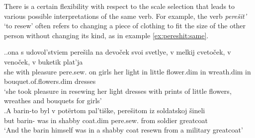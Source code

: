 %
%
%

There is a certain flexibility with respect to the scale selection that leads to various possible interpretations of the same  verb. For example, the verb \textit{pere\v{s}it'} `to resew' often refers to changing a piece of clothing to fit the size of the other person without changing its kind, as in example \ref{ex:pereshit:same}.\largerpage[-1]

\ex.\label{ex:pereshit}\ag.\label{ex:pereshit:same}ona s udovol'stviem pere\v{s}ila na devo\v{c}ek svoi svetlye, v melkij cveto\v{c}ek, v veno\v{c}ek, v buketik plat'ja\\
she with pleasure pere.sew. on girls her light in little flower.dim in wreath.dim in bouquet.of.flowers.dim dresses\\
\trans `she took pleasure in resewing her light dresses with prints of little flowers, wreathes and bouquets for girls'\\
\bg.\label{ex:pereshit:other}A barin-to byl v pot\"{e}rtom pal'ti\v{s}ke, pere\v{s}itom iz soldatskoj \v{s}ineli\\
but barin- was in shabby coat.dim pere.sew. from soldier greatcoat\\
\trans `And the barin himself was in a shabby coat resewn from a military greatcoat'

